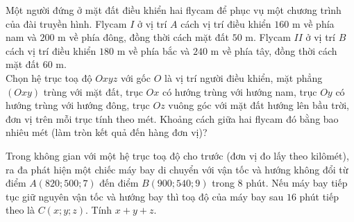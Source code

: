 \begin{bt}%

	Một người đứng ở mặt đất điều khiển hai flycam để phục vụ một chương trình của đài truyền hình. Flycam $I$ ở vị trí $A$ cách vị trí điều khiển $160$ m về phía nam và $200$ m về phía đông, đồng thời cách mặt đất $50$ m. Flycam $II$ ở vị trí $B$ cách vị trí điều khiển $180$ m về phía bắc và $240$ m về phía tây, đồng thời cách mặt đất $60$ m.\\
	Chọn hệ trục toạ độ $Oxyz$ với gốc $O$ là vị trí người điều khiển, mặt phẳng $(Oxy)$ trùng với mặt đất, trục $Ox$ có hướng trùng với hướng nam, trục $Oy$ có hướng trùng với hướng đông, trục $Oz$ vuông góc với mặt đất hướng lên bầu trời, đơn vị trên mỗi trục tính theo mét. Khoảng cách giữa hai flycam đó bằng bao nhiêu mét (làm tròn kết quả đến hàng đơn vị)?
\end{bt}

\begin{bt}%

	Trong không gian với một hệ trục toạ độ cho trước (đơn vị đo lấy theo kilômét), ra đa phát hiện một chiếc máy bay di chuyển với vận tốc và hướng không đổi từ điểm $A(820;500;7)$ đến điểm $B(900;540;9)$ trong $8$ phút. Nếu máy bay tiếp tục giữ nguyên vận tốc và hướng bay thì toạ độ của máy bay sau $16$ phút tiếp theo là $C(x;y;z)$. Tính $x+y+z$.
	
\end{bt}


